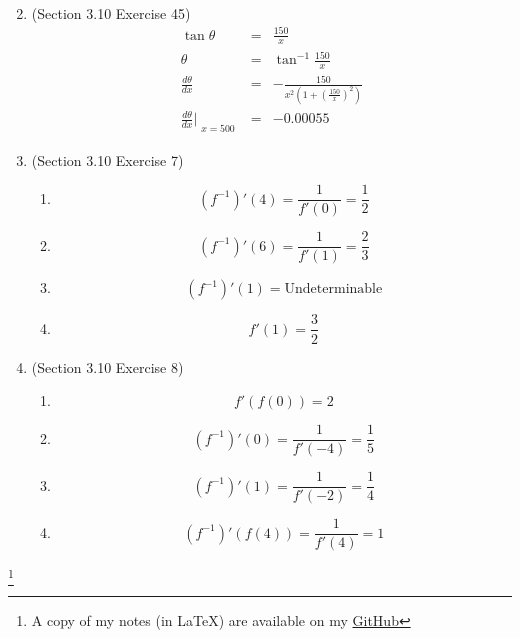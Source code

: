 \documentclass{article}
\newcommand\blfootnote[1]{
    \begingroup
    \renewcommand\thefootnote{}\footnote{#1}
    \addtocounter{footnote}{-1}
    \endgroup
}
\begin{document}
\begin{enumerate}
\begin{eqnarray}
        \end{eqnarray}
    \item (Section 3.10 Exercise 45)
        \begin{eqnarray}
            \tan{\theta} &=& \frac{150}{x} \\
            \theta &=& \tan^{-1}{\frac{150}{x}} \\
            \frac{d\theta}{dx} &=& -\frac{150}{x^2\left(1 + \left(\frac{150}{x}\right)^2\right)} \\
            \frac{d\theta}{dx}\Bigr|_{\substack{x = 500}} &=& -0.00055
        \end{eqnarray}
    \item (Section 3.10 Exercise 7)
        \begin{enumerate}
            \item $$\left(f^{-1}\right)'\left(4\right) = \frac{1}{f'(0)} = \frac{1}{2}$$
            \item $$\left(f^{-1}\right)'\left(6\right) = \frac{1}{f'(1)} = \frac{2}{3}$$
            \item $$\left(f^{-1}\right)'\left(1\right) = \text{Undeterminable}$$
            \item $$f'\left(1\right) = \frac{3}{2}$$
        \end{enumerate}
    \item (Section 3.10 Exercise 8)
        \begin{enumerate}
            \item $$f'\left(f\left(0\right)\right) = 2$$
            \item $$\left(f^{-1}\right)'\left(0\right) = \frac{1}{f'(-4)} = \frac{1}{5}$$
            \item $$\left(f^{-1}\right)'\left(1\right) = \frac{1}{f'(-2)} = \frac{1}{4}$$
            \item $$\left(f^{-1}\right)'\left(f\left(4\right)\right) = \frac{1}{f'(4)} = 1$$
        \end{enumerate}
\end{enumerate}

\blfootnote{A copy of my notes (in \LaTeX) are available on my \href{https://github.com/onlinechronically/MATH-211}{GitHub}}
\end{document}
